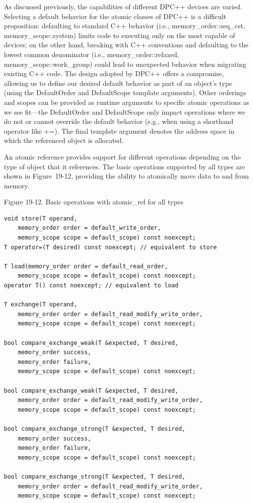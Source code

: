 As discussed previously, the capabilities of different DPC++ devices are varied. Selecting a default behavior for the atomic classes of DPC++ is a difficult proposition: defaulting to standard C++ behavior (i.e., memory\_order::seq\_cst, memory\_scope::system) limits code to executing only on the most capable of devices; on the other hand, breaking with C++ conventions and defaulting to the lowest common denominator (i.e., memory\_order::relaxed, memory\_scope::work\_group) could lead to unexpected behavior when migrating existing C++ code. The design adopted by DPC++ offers a compromise, allowing us to define our desired default behavior as part of an object’s type (using the DefaultOrder and DefaultScope template arguments). Other orderings and scopes can be provided as runtime arguments to specific atomic operations as we see fit—the DefaultOrder and DefaultScope only impact operations where we do not or cannot override the default behavior (e.g., when using a shorthand operator like +=). The final template argument denotes the address space in which the referenced object is allocated.\par

An atomic reference provides support for different operations depending on the type of object that it references. The basic operations supported by all types are shown in Figure 19-12, providing the ability to atomically move data to and from memory.\par

\hspace*{\fill} \par %
Figure 19-12. Basic operations with atomic\_ref for all types
\begin{lstlisting}[caption={}]
void store(T operand,
	memory_order order = default_write_order,
	memory_scope scope = default_scope) const noexcept;
T operator=(T desired) const noexcept; // equivalent to store

T load(memory_order order = default_read_order,
	memory_scope scope = default_scope) const noexcept;
operator T() const noexcept; // equivalent to load

T exchange(T operand,
	memory_order order = default_read_modify_write_order,
	memory_scope scope = default_scope) const noexcept;
	
bool compare_exchange_weak(T &expected, T desired,
	memory_order success,
	memory_order failure,
	memory_scope scope = default_scope) const noexcept;
	
bool compare_exchange_weak(T &expected, T desired,
	memory_order order = default_read_modify_write_order,
	memory_scope scope = default_scope) const noexcept;
	
bool compare_exchange_strong(T &expected, T desired,
	memory_order success,
	memory_order failure,
	memory_scope scope = default_scope) const noexcept;
	
bool compare_exchange_strong(T &expected, T desired,
	memory_order order = default_read_modify_write_order,
	memory_scope scope = default_scope) const noexcept;
\end{lstlisting}

